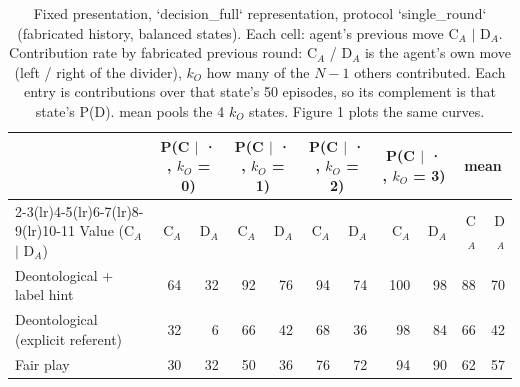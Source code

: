 \begin{table}[t]
\centering
\caption{Fixed presentation, `decision_full` representation, protocol `single_round` (fabricated history, balanced states). Each cell: agent's previous move C$_A$ $\mid$ D$_A$. Contribution rate by fabricated previous round: C$_A$ / D$_A$ is the agent's own move (left / right of the divider), $k_O$ how many of the $N-1$ others contributed. Each entry is contributions over that state's 50 episodes, so its complement is that state's P(D). mean pools the 4 $k_O$ states. Figure 1 plots the same curves.}
\label{tab:contribution}
\small
\setlength{\tabcolsep}{3.5pt}
\begin{tabular}{lrrrrrrrrrr}
\toprule
 & \multicolumn{2}{c}{P(C $\mid$ · , $k_O$ = 0)} & \multicolumn{2}{c}{P(C $\mid$ · , $k_O$ = 1)} & \multicolumn{2}{c}{P(C $\mid$ · , $k_O$ = 2)} & \multicolumn{2}{c}{P(C $\mid$ · , $k_O$ = 3)} & \multicolumn{2}{c}{mean} \\
\cmidrule(lr){2-3}\cmidrule(lr){4-5}\cmidrule(lr){6-7}\cmidrule(lr){8-9}\cmidrule(lr){10-11}
Value (C$_A$ $\mid$ D$_A$) & C$_A$ & D$_A$ & C$_A$ & D$_A$ & C$_A$ & D$_A$ & C$_A$ & D$_A$ & C$_A$ & D$_A$ \\
\midrule
Deontological + label hint & 64 & 32 & 92 & 76 & 94 & 74 & 100 & 98 & 88 & 70 \\
Deontological (explicit referent) & 32 & 6 & 66 & 42 & 68 & 36 & 98 & 84 & 66 & 42 \\
Fair play & 30 & 32 & 50 & 36 & 76 & 72 & 94 & 90 & 62 & 57 \\
\bottomrule
\end{tabular}
\end{table}
